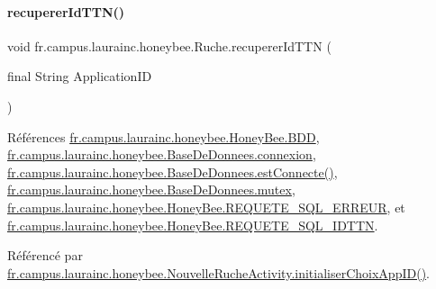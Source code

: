 \paragraph{\texorpdfstring{recuperer\+Id\+T\+T\+N()}{recupererIdTTN()}}
{\footnotesize\ttfamily void fr.\+campus.\+laurainc.\+honeybee.\+Ruche.\+recuperer\+Id\+T\+TN (\begin{DoxyParamCaption}\item[{final String}]{Application\+ID }\end{DoxyParamCaption})}



Références \hyperlink{classfr_1_1campus_1_1laurainc_1_1honeybee_1_1_honey_bee_abfb4f6cc1c8bb793c37ccb8408abc51c}{fr.\+campus.\+laurainc.\+honeybee.\+Honey\+Bee.\+B\+DD}, \hyperlink{classfr_1_1campus_1_1laurainc_1_1honeybee_1_1_base_de_donnees_a358899633f17b8cd00dd2c4cfdd40abe}{fr.\+campus.\+laurainc.\+honeybee.\+Base\+De\+Donnees.\+connexion}, \hyperlink{classfr_1_1campus_1_1laurainc_1_1honeybee_1_1_base_de_donnees_a735f54c2c183a595c9a9a5ba947491f5}{fr.\+campus.\+laurainc.\+honeybee.\+Base\+De\+Donnees.\+est\+Connecte()}, \hyperlink{classfr_1_1campus_1_1laurainc_1_1honeybee_1_1_base_de_donnees_a0dd6f285a11459c086adea6080bed282}{fr.\+campus.\+laurainc.\+honeybee.\+Base\+De\+Donnees.\+mutex}, \hyperlink{classfr_1_1campus_1_1laurainc_1_1honeybee_1_1_honey_bee_a275b7a8582c8193ff444d21928ef7e36}{fr.\+campus.\+laurainc.\+honeybee.\+Honey\+Bee.\+R\+E\+Q\+U\+E\+T\+E\+\_\+\+S\+Q\+L\+\_\+\+E\+R\+R\+E\+UR}, et \hyperlink{classfr_1_1campus_1_1laurainc_1_1honeybee_1_1_honey_bee_a114d1a573571b6a77a2d0e48a0ee3d5c}{fr.\+campus.\+laurainc.\+honeybee.\+Honey\+Bee.\+R\+E\+Q\+U\+E\+T\+E\+\_\+\+S\+Q\+L\+\_\+\+I\+D\+T\+TN}.



Référencé par \hyperlink{classfr_1_1campus_1_1laurainc_1_1honeybee_1_1_nouvelle_ruche_activity_a25bf91899b217681bda733e7783d0bf9}{fr.\+campus.\+laurainc.\+honeybee.\+Nouvelle\+Ruche\+Activity.\+initialiser\+Choix\+App\+I\+D()}.


